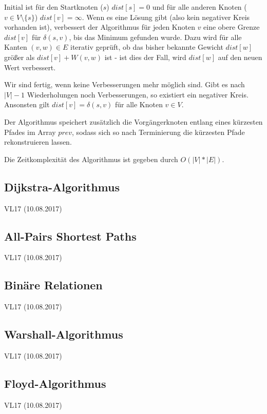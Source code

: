 \documentclass[12pt]{article}
\begin{document}
Initial ist für den Startknoten ($s$) $dist[s] = 0$ und für alle anderen Knoten ($v \in V \setminus \{s\}$) $dist[v] = \infty$. Wenn es eine Lösung gibt (also kein negativer Kreis vorhanden ist), verbessert der Algorithmus für jeden Knoten $v$ eine obere Grenze $dist[v]$ für $\delta(s, v)$, bis das Minimum gefunden wurde. Dazu wird für alle Kanten $(v, w) \in E$ iterativ geprüft, ob das bisher bekannte Gewicht $dist[w]$ größer als $dist[v] + W(v, w)$ ist - ist dies der Fall, wird $dist[w]$ auf den neuen Wert verbessert.

Wir sind fertig, wenn keine Verbesserungen mehr möglich sind. Gibt es nach $|V|-1$ Wiederholungen noch Verbesserungen, so existiert ein negativer Kreis. Ansonsten gilt $dist[v] = \delta(s, v)$ für alle Knoten $v \in V$.

Der Algorithmus speichert zusätzlich die Vorgängerknoten entlang eines kürzesten Pfades im Array $prev$, sodass sich so nach Terminierung die kürzesten Pfade rekonstruieren lassen.

Die Zeitkomplexität des Algorithmus ist gegeben durch $O(|V|*|E|)$.

\subsection{Dijkstra-Algorithmus}

VL17 (10.08.2017)

\subsection{All-Pairs Shortest Paths}

VL17 (10.08.2017)

\subsection{Binäre Relationen}

VL17 (10.08.2017)

\subsection{Warshall-Algorithmus}

VL17 (10.08.2017)

\subsection{Floyd-Algorithmus}

VL17 (10.08.2017)
\end{document}
